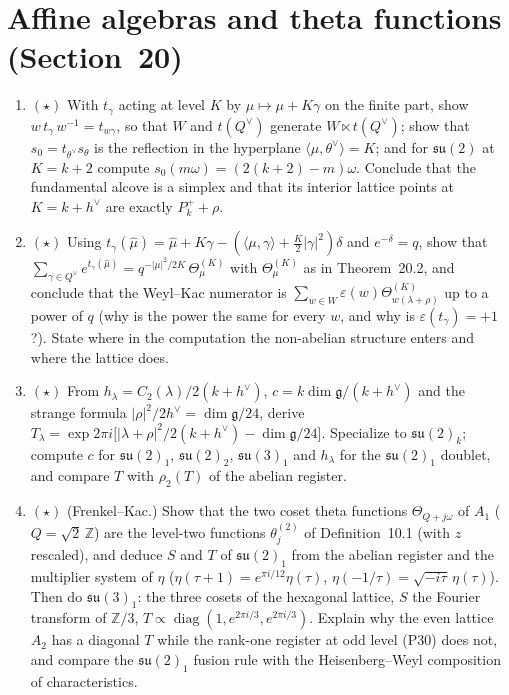 \documentclass[11pt]{article}
\newcommand{\Z}{\mathbb{Z}}
\begin{document}
\section{Affine algebras and theta functions (Section~20)}

\begin{enumerate}[label=\textbf{P\arabic*.},leftmargin=*,start=55]
\item $(\star)$ With $t_\gamma$ acting at level $K$
  by $\mu\mapsto\mu+K\gamma$ on the finite part, show
  $w\,t_\gamma\,w^{-1} = t_{w\gamma}$, so that $W$ and $t(Q^\vee)$ generate
  $W\ltimes t(Q^\vee)$; show that $s_0 = t_{\theta^\vee}s_\theta$ is the
  reflection in the hyperplane $\langle\mu,\theta^\vee\rangle = K$; and for
  $\mathfrak{su}(2)$ at $K = k+2$ compute $s_0(m\omega) = (2(k+2)-m)\omega$.
  Conclude that the fundamental alcove is a simplex and that its interior
  lattice points at $K = k+h^\vee$ are exactly $P_k^+ + \rho$.
\item $(\star)$ Using
  $t_\gamma(\hat\mu) = \hat\mu+K\gamma-(\langle\mu,\gamma\rangle+\tfrac K2|\gamma|^2)\delta$
  and $e^{-\delta} = q$, show that
  $\sum_{\gamma\in Q^\vee}e^{t_\gamma(\hat\mu)} = q^{-|\mu|^2/2K}\,\Theta^{(K)}_\mu$
  with $\Theta^{(K)}_\mu$ as in Theorem~20.2, and conclude that
  the Weyl--Kac numerator is $\sum_{w\in W}\varepsilon(w)\Theta^{(K)}_{w(\lambda+\rho)}$
  up to a power of $q$ (why is the power the same for every $w$, and why
  is $\varepsilon(t_\gamma) = +1$?). State where in the computation the
  non-abelian structure enters and where the lattice does.
\item $(\star)$ From $h_\lambda = C_2(\lambda)/2(k+h^\vee)$,
  $c = k\dim\mathfrak g/(k+h^\vee)$ and the strange formula
  $|\rho|^2/2h^\vee = \dim\mathfrak g/24$, derive
  $T_\lambda = \exp2\pi i\big[|\lambda+\rho|^2/2(k+h^\vee)-\dim\mathfrak g/24\big]$.
  Specialize to $\mathfrak{su}(2)_k$; compute $c$ for $\mathfrak{su}(2)_1$,
  $\mathfrak{su}(2)_2$, $\mathfrak{su}(3)_1$ and $h_\lambda$ for the
  $\mathfrak{su}(2)_1$ doublet, and compare $T$ with $\rho_2(T)$ of the
  abelian register.
\item $(\star)$ (Frenkel--Kac.) Show that the two coset
  theta functions $\Theta_{Q+j\omega}$ of $A_1$ ($Q = \sqrt2\,\Z$) are the
  level-two functions $\theta^{(2)}_j$ of Definition~10.1 (with
  $z$ rescaled), and deduce $S$ and $T$ of $\mathfrak{su}(2)_1$ from the
  abelian register and the multiplier system of $\eta$
  ($\eta(\tau+1) = e^{\pi i/12}\eta(\tau)$, $\eta(-1/\tau) = \sqrt{-i\tau}\,\eta(\tau)$).
  Then do $\mathfrak{su}(3)_1$: the three cosets of the hexagonal lattice,
  $S$ the Fourier transform of $\Z/3$,
  $T\propto\operatorname{diag}(1,e^{2\pi i/3},e^{2\pi i/3})$. Explain why
  the even lattice $A_2$ has a diagonal $T$ while the rank-one register at
  odd level (P30) does not, and compare the
  $\mathfrak{su}(2)_1$ fusion rule with the Heisenberg--Weyl composition of
  characteristics.
\end{enumerate}
\end{document}
